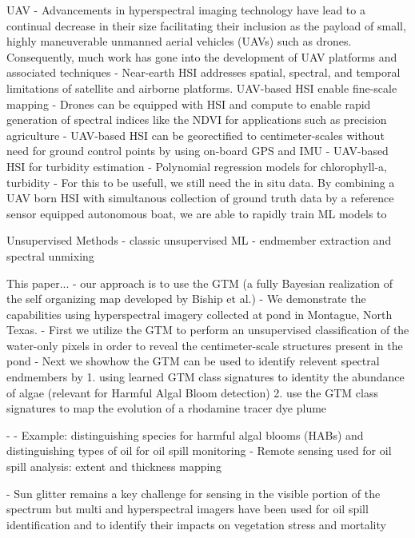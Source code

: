 \documentclass{article}
\begin{document}
UAV
- Advancements in hyperspectral imaging technology have lead to a continual decrease in their size facilitating their inclusion as the payload of small, highly maneuverable unmanned aerial vehicles (UAVs) such as drones. Consequently, much work has gone into the development of UAV platforms and associated techniques 
- Near-earth HSI addresses spatial, spectral, and temporal limitations of satellite and airborne platforms. UAV-based HSI enable fine-scale mapping \cite{banerjee2020uav}
- Drones can be equipped with HSI and compute to enable rapid generation of spectral indices like the NDVI for applications such as precision agriculture \cite{horstrand2019uav}
- UAV-based HSI can be georectified to centimeter-scales without need for ground control points by using on-board GPS and IMU \cite{arroyo2019implementation}
- UAV-based HSI for turbidity estimation \cite{vogt2016near}
- Polynomial regression models for chlorophyll-a, turbidity \cite{zhang2022selection}
- For this to be usefull, we still need the in situ data. By combining a UAV born HSI with simultanous collection of ground truth data by a reference sensor equipped autonomous boat, we are able to rapidly train ML models to 


Unsupervised Methods
- classic unsupervised ML
- endmember extraction and spectral unmixing

This paper...
- our approach is to use the GTM (a fully Bayesian realization of the self organizing map developed by Biship et al.)
- We demonstrate the capabilities using hyperspectral imagery collected at pond in Montague, North Texas. 
- First we utilize the GTM to perform an unsupervised classification of the water-only pixels in order to reveal the centimeter-scale structures present in the pond
- Next we showhow the GTM can be used to identify relevent spectral endmembers by 
    1. using learned GTM class signatures to identity the abundance of algae (relevant for Harmful Algal Bloom detection)
    2. use the GTM class signatures to map the evolution of a rhodamine tracer dye plume


- \cite{koponen2002lake}
- Example: distinguishing species for harmful algal blooms (HABs) and distinguishing types of oil for oil spill monitoring
- Remote sensing used for oil spill analysis: extent and thickness mapping \cite{kokaly2013spectroscopic, leifer2012state}

- Sun glitter remains a key challenge for sensing in the visible portion of the spectrum but multi and hyperspectral imagers have been used for oil spill identification and to identify their impacts on vegetation stress and mortality \cite{fingas2014review, khan2018modern}
\end{document}
